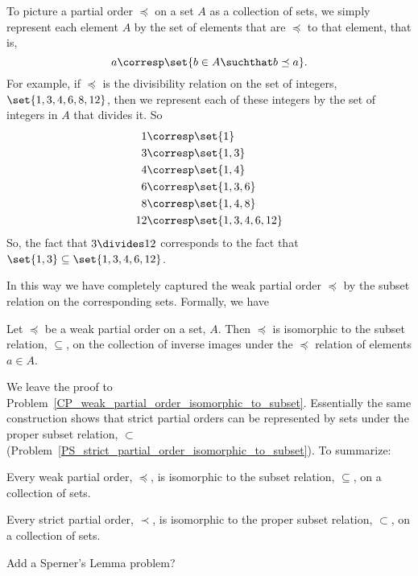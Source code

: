 To picture a partial order $\preceq$ on a set $A$ as a collection of
sets, we simply represent each element $A$ by the set of elements
that are $\preceq$ to that element, that is,
\[
a \corresp \set{b \in A \suchthat b \preceq a}.
\]
For example, if $\preceq$ is the divisibility relation on the set of
integers, $\set{1,3,4,6,8,12}$, then we represent each of these integers
by the set of integers in $A$ that divides it.  So
\begin{align*}
1 & \corresp \set{1}\\
3 & \corresp \set{1,3}\\
4 & \corresp \set{1,4}\\
6 & \corresp \set{1,3,6}\\
8 & \corresp \set{1,4,8}\\
12 & \corresp \set{1,3,4,6, 12}
\end{align*}
So, the fact that $3 \divides 12$ corresponds to the fact that $\set{1,3}
\subseteq \set{1,3,4,6, 12}$.

In this way we have completely captured the weak partial order $\preceq$ by the
subset relation on the corresponding sets.  Formally, we have
\begin{lemma}\label{rgb}
  Let $\preceq$ be a weak partial order on a set, $A$.  Then $\preceq$
  is isomorphic to the subset relation, $\subseteq$, on the collection
  of inverse images under the $\preceq$ relation of elements $a \in
  A$.
\end{lemma}
We leave the proof to
Problem~\ref{CP_weak_partial_order_isomorphic_to_subset}.  Essentially
the same construction shows that strict partial orders can be
represented by sets under the proper subset%
relation, $\subset$ (Problem~\ref{PS_strict_partial_order_isomorphic_to_subset}).  To
summarize:
\begin{theorem}\label{thm:posetrepsets}
  Every weak partial order, $\preceq$, is isomorphic to the subset
  relation, $\subseteq$, on a collection of sets.

  Every strict partial order, $\prec$, is isomorphic to the proper
  subset relation, $\subset$, on a collection of sets.
\end{theorem}


\begin{problems}

\classproblems
{}

\homeworkproblems
{}

\begin{editingnotes}
Add a Sperner's Lemma problem?
\end{editingnotes}

\end{problems}


